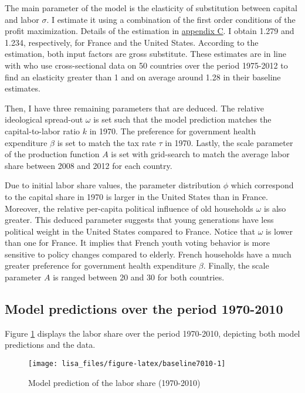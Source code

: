 \documentclass[
]{article}
\begin{document}
The main parameter of the model is the elasticity of substitution between capital and labor \(\sigma\). I estimate it using a combination of the first order conditions of the profit maximization. Details of the estimation in \href{app-C}{appendix C}. I obtain 1.279 and 1.234, respectively, for France and the United States. According to the estimation, both input factors are gross substitute. These estimates are in line with \citet{Karabarbounis2014} who use cross-sectional data on 50 countries over the period 1975-2012 to find an elasticity greater than 1 and on average around 1.28 in their baseline estimates.

Then, I have three remaining parameters that are deduced. The relative ideological spread-out \(\omega\) is set such that the model prediction matches the capital-to-labor ratio \(k\) in 1970. The preference for government health expenditure \(\beta\) is set to match the tax rate \(\tau\) in 1970. Lastly, the scale parameter of the production function \(A\) is set with grid-search to match the average labor share between 2008 and 2012 for each country.

Due to initial labor share values, the parameter distribution \(\phi\) which correspond to the capital share in 1970 is larger in the United States than in France. Moreover, the relative per-capita political influence of old households \(\omega\) is also greater. This deduced parameter suggests that young generations have less political weight in the United States compared to France. Notice that \(\omega\) is lower than one for France. It implies that French youth voting behavior is more sensitive to policy changes compared to elderly. French households have a much greater preference for government health expenditure \(\beta\). Finally, the scale parameter \(A\) is ranged between 20 and 30 for both countries.

\hypertarget{pred7010}{%
\subsection{Model predictions over the period 1970-2010}\label{pred7010}}

Figure \ref{fig:baseline7010} displays the labor share over the period 1970-2010, depicting both model predictions and the data.

\begin{figure}[!tb]

{\centering \texttt{[image: lisa\_files/figure-latex/baseline7010-1]} 

}

\caption{Model prediction of the labor share (1970-2010)}\label{fig:baseline7010}
\end{figure}
\end{document}
